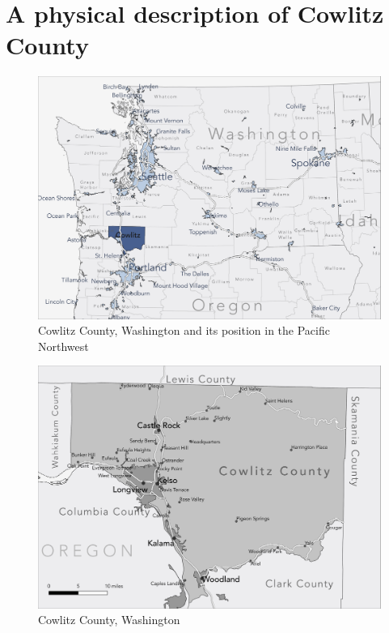 \section{A physical description of Cowlitz County}
\label{sec:physical_description}

\begin{figure}[p]
    \centering
    \includegraphics[angle=90, origin=c, width = 5.75in]{Figures/other_figures/Cowlitz_Context_small.jpg}
    \caption{Cowlitz County, Washington and its position in the Pacific Northwest}
    \label{fig:map_of_cowlitz_big}
\end{figure}

\begin{figure}[p]
    \centering
    \includegraphics[angle=90, origin=c, width = 5.75in]{Figures/other_figures/Cowlitz_Focus_small.jpg}
    \caption{Cowlitz County, Washington}
    \label{fig:map_of_cowlitz_zoom}
\end{figure}

